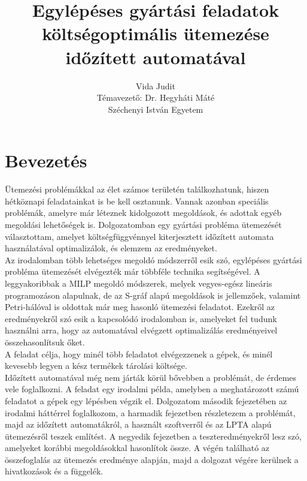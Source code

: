 \documentclass {report}
\begin{document}
\title{Egylépéses gyártási feladatok költségoptimális ütemezése időzített automatával}

\author{Vida Judit\\Témavezető: Dr. Hegyháti Máté\\Széchenyi István Egyetem}
\maketitle


\tableofcontents
\chapter{Bevezetés}
Ütemezési problémákkal az élet számos területén találkozhatunk, hiszen hétköznapi feladatainkat is be kell osztanunk. Vannak azonban speciális problémák, amelyre már léteznek kidolgozott megoldások, és adottak egyéb megoldási lehetőségek is. Dolgozatomban egy gyártási probléma ütemezését választottam, amelyet költségfüggvénnyel kiterjesztett időzített automata használatával optimalizálok, és elemzem az eredményeket.\\
Az irodalomban több lehetséges megoldó módszerről esik szó, egylépéses gyártási probléma ütemezését elvégezték már többféle technika segítségével. A leggyakoribbak a MILP megoldó módszerek, melyek vegyes-egész lineáris programozáson alapulnak, de az S-gráf alapú megoldások is jellemzőek, valamint Petri-hálóval is oldottak már meg hasonló ütemezési feladatot. Ezekről az eredményekről szó esik a kapcsolódó irodalomban is, amelyeket fel tudunk használni arra, hogy az automatával elvégzett optimalizálás eredményeivel összehasonlítsuk őket. \\
A feladat célja, hogy minél több feladatot elvégezzenek a gépek, és minél kevesebb legyen a kész termékek tárolási költsége.\\
Időzített automatával még nem járták körül bővebben a problémát, de érdemes vele foglalkozni. A feladat egy irodalmi példa, amelyben a meghatározott számú feladatot a gépek egy lépésben végzik el. 
Dolgozatom második fejezetében az irodalmi háttérrel foglalkozom, a harmadik fejezetben részletezem a problémát, majd az időzített automatákról, a használt szoftverről és az LPTA alapú ütemezésről teszek említést. A negyedik fejezetben a teszteredményekről lesz szó, amelyeket korábbi megoldásokkal hasonlítok össze. A végén található az összefoglalás az ütemezés eredménye alapján, majd a dolgozat végére kerülnek a hivatkozások és a függelék. 
\end{document}

